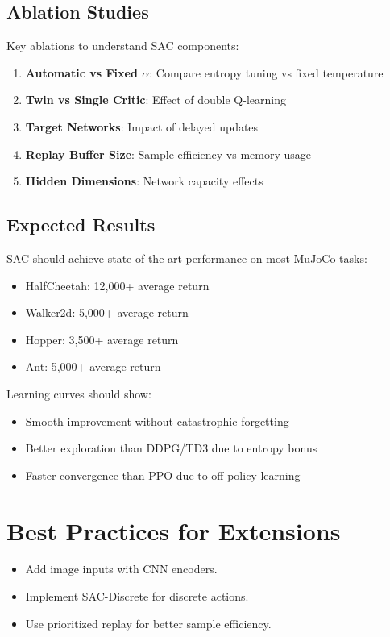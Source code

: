 \documentclass[11pt,a4paper]{article}
\begin{document}
\subsection{Ablation Studies}
Key ablations to understand SAC components:
\begin{enumerate}
  \item \textbf{Automatic vs Fixed $\alpha$}: Compare entropy tuning vs fixed temperature
  \item \textbf{Twin vs Single Critic}: Effect of double Q-learning
  \item \textbf{Target Networks}: Impact of delayed updates
  \item \textbf{Replay Buffer Size}: Sample efficiency vs memory usage
  \item \textbf{Hidden Dimensions}: Network capacity effects
\end{enumerate}

\subsection{Expected Results}
SAC should achieve state-of-the-art performance on most MuJoCo tasks:
\begin{itemize}
  \item HalfCheetah: 12,000+ average return
  \item Walker2d: 5,000+ average return
  \item Hopper: 3,500+ average return
  \item Ant: 5,000+ average return
\end{itemize}

Learning curves should show:
\begin{itemize}
  \item Smooth improvement without catastrophic forgetting
  \item Better exploration than DDPG/TD3 due to entropy bonus
  \item Faster convergence than PPO due to off-policy learning
\end{itemize}

\section{Best Practices for Extensions}
\begin{itemize}
  \item Add image inputs with CNN encoders.
  \item Implement SAC-Discrete for discrete actions.
  \item Use prioritized replay for better sample efficiency.
\end{itemize}
\end{document}
